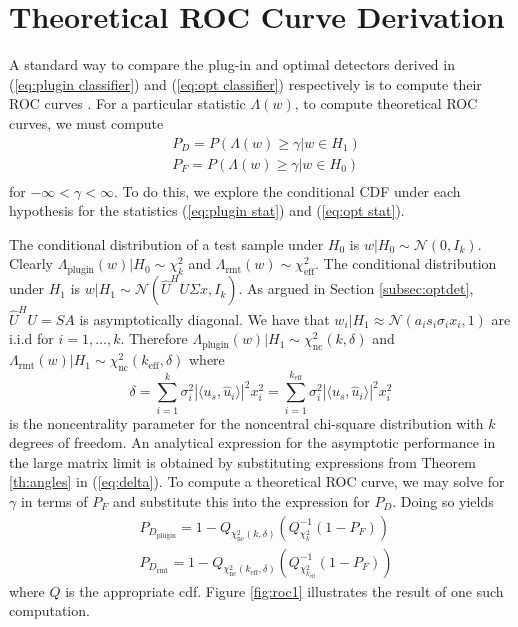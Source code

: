 \section{Theoretical ROC Curve Derivation}\label{sec:roc}
A standard way to compare the plug-in and optimal detectors derived in (\ref{eq:plugin classifier}) and (\ref{eq:opt classifier}) respectively is to compute their ROC curves \cite{fawcett2006introduction}. For a particular statistic $\Lambda(w)$, to compute theoretical ROC curves, we must compute
\begin{equation}\label{eq:target cdf}
\begin{aligned}
&P_D = P(\Lambda(w) \geq \gamma| w\in H_1)\\
&P_F = P(\Lambda(w) \geq \gamma| w\in H_0)\\
\end{aligned}
\end{equation}
for $-\infty<\gamma<\infty$. To do this, we explore the conditional CDF under each hypothesis for the statistics (\ref{eq:plugin stat}) and (\ref{eq:opt stat}).

The conditional distribution of a test sample under $H_0$ is $w|H_0\sim\mathcal{N}(0,I_k)$. Clearly $\Lambda_\text{plugin}(w)|H_0\sim\chi_k^2$ and $\Lambda_\text{rmt}(w)\sim\chi_\text{eff}^2$. The conditional distribution under $H_1$ is $w|H_1\sim\mathcal{N}(\widehat{U}^HU\Sigma x,I_k)$. As argued in Section \ref{subsec:optdet}, $\widehat{U}^HU=SA$ is asymptotically diagonal. We have that $w_i|H_1\approx\mathcal{N}(a_is_i\sigma_ix_i,1)$ are i.i.d for $i=1,\dots,k$. Therefore $\Lambda_\text{plugin}(w)|H_1\sim\chi_\text{nc}^2(k,\delta)$ and $\Lambda_\text{rmt}(w)|H_1\sim\chi_\text{nc}^2(k_\text{eff},\delta)$ where
\begin{equation}\label{eq:delta}
\delta=\sum_{i=1}^k\sigma_i^2|\langle u_s,\widehat{u}_i\rangle|^2x_i^2=\sum_{i=1}^{k_\text{eff}}\sigma_i^2|\langle u_s,\widehat{u}_i\rangle|^2x_i^2
 \end{equation}
is the noncentrality parameter for the noncentral chi-square distribution with $k$ degrees of freedom. An analytical expression for the asymptotic performance in the large matrix limit  is obtained by substituting expressions from Theorem \ref{th:angles} in (\ref{eq:delta}). To compute a theoretical ROC curve, we may solve for $\gamma$ in terms of $P_F$ and substitute this into the expression for $P_D$. Doing so yields
\begin{equation}\label{eq:roc}
\begin{aligned}
&P_{D_\text{plugin}}=1-Q_{\chi_\text{nc}^2(k,\delta)}\left(Q^{-1}_{\chi^2_k}\left(1-P_F\right)\right)\\
&P_{D_\text{rmt}}=1-Q_{\chi_\text{nc}^2(k_\text{eff},\delta)}\left(Q^{-1}_{\chi^2_{k_\text{eff}}}\left(1-P_F\right)\right)
\end{aligned}
\end{equation}
where $Q$ is the appropriate cdf. Figure \ref{fig:roc1} illustrates the result of one such computation.

